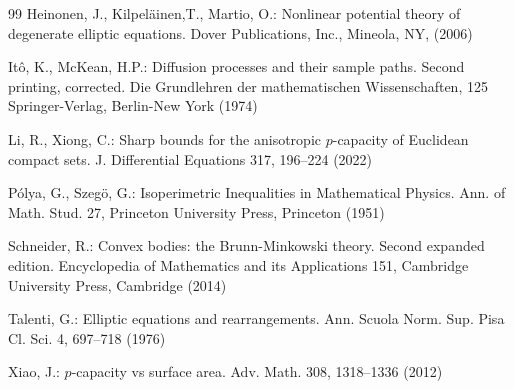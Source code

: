 \documentclass[a4paper,9pt]{article}
\begin{document}
\begin{thebibliography} {99}
 Heinonen, J., Kilpel\"{a}inen,T., Martio, O.: Nonlinear potential theory of degenerate elliptic equations. Dover Publications, Inc., Mineola, NY, (2006)

 It\^o, K., McKean, H.P.: Diffusion processes and their sample paths. Second printing, corrected. Die Grundlehren der mathematischen Wissenschaften, 125 Springer-Verlag, Berlin-New York (1974)

 Li, R., Xiong, C.: Sharp bounds for the anisotropic $p$-capacity of Euclidean compact sets.
J. Differential Equations 317, 196--224 (2022)

 P\'{o}lya, G., Szeg\"{o}, G.: Isoperimetric Inequalities in Mathematical Physics. Ann. of Math. Stud. 27, Princeton University Press, Princeton (1951)

 Schneider, R.: Convex bodies: the Brunn-Minkowski theory. Second expanded edition. Encyclopedia of Mathematics and its Applications 151, Cambridge University Press, Cambridge (2014)

 Talenti, G.: Elliptic equations and rearrangements. Ann. Scuola Norm. Sup. Pisa Cl. Sci. 4, 697--718 (1976)


 Xiao, J.: $p$-capacity vs surface area. Adv. Math. 308, 1318--1336 (2012)



\end{thebibliography}
\end{document}
